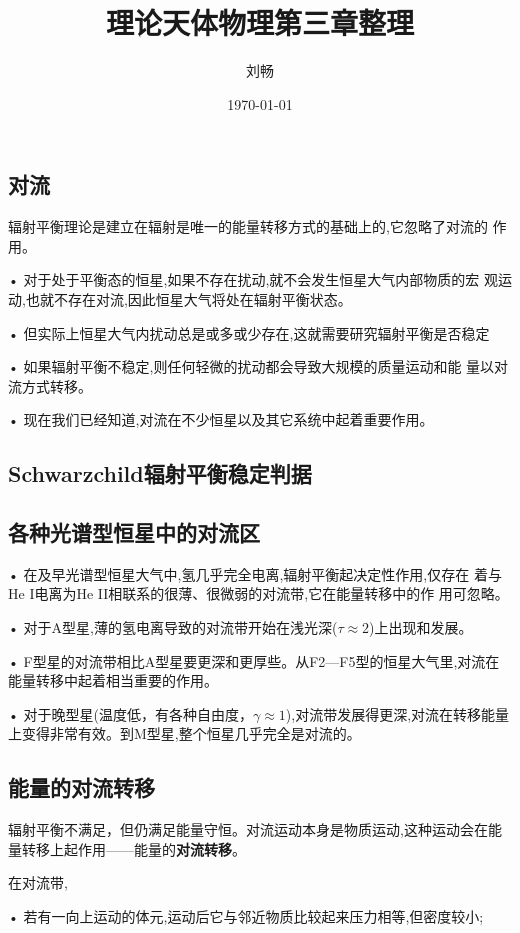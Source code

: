 \documentclass[UTF8]{article}
\begin{document}
\pagestyle{plain}
\title{\heiti 理论天体物理第三章整理}
\author{\songti 刘畅}
\date{\today}
\maketitle
\begin{fangsong}
\section{对流}
辐射平衡理论是建立在辐射是唯一的能量转移方式的基础上的,它忽略了对流的
作用。


• 对于处于平衡态的恒星,如果不存在扰动,就不会发生恒星大气内部物质的宏
观运动,也就不存在对流,因此恒星大气将处在辐射平衡状态。

• 但实际上恒星大气内扰动总是或多或少存在,这就需要研究辐射平衡是否稳定

• 如果辐射平衡不稳定,则任何轻微的扰动都会导致大规模的质量运动和能
量以对流方式转移。

• 现在我们已经知道,对流在不少恒星以及其它系统中起着重要作用。

\subsection{Schwarzchild辐射平衡稳定判据}
\subsection{各种光谱型恒星中的对流区}
• 在及早光谱型恒星大气中,氢几乎完全电离,辐射平衡起决定性作用,仅存在
着与He I电离为He II相联系的很薄、很微弱的对流带,它在能量转移中的作
用可忽略。

• 对于A型星,薄的氢电离导致的对流带开始在浅光深($\tau \approx 2$)上出现和发展。

• F型星的对流带相比A型星要更深和更厚些。从F2—F5型的恒星大气里,对流在能量转移中起着相当重要的作用。

• 对于晚型星(温度低，有各种自由度，$\gamma\approx1$),对流带发展得更深,对流在转移能量上变得非常有效。到M型星,整个恒星几乎完全是对流的。

\subsection{能量的对流转移}
辐射平衡不满足，但仍满足能量守恒。对流运动本身是物质运动,这种运动会在能量转移上起作用——能量的\textbf{对流转移}。

在对流带,

• 若有一向上运动的体元,运动后它与邻近物质比较起来压力相等,但密度较小;


\end{fangsong}
\end{document}
